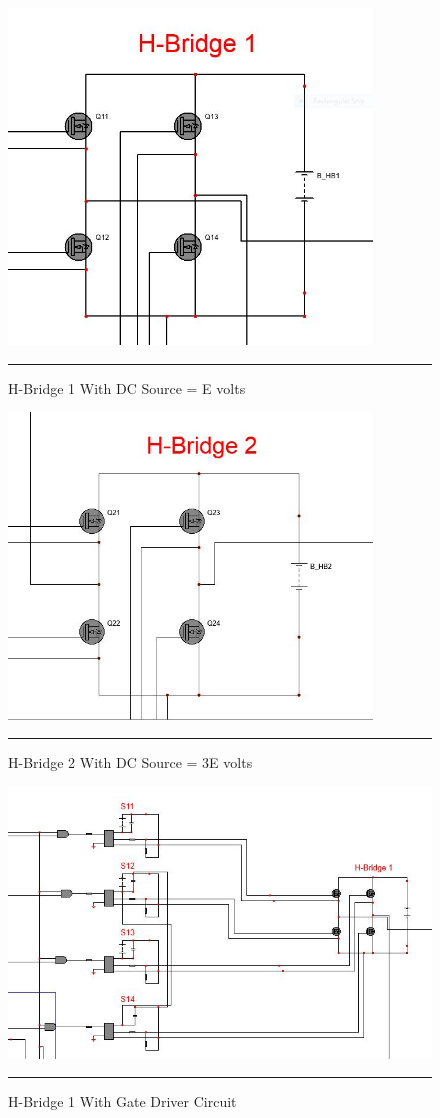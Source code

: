 \begin{figure}[htbp]
	\centering
	\includegraphics[width = 3.8in]{./Figures/HBridge1.JPG}
	\rule{35em}{1pt}
	\caption{H-Bridge 1 With DC Source = E volts}
	\label{fig:4}
\end{figure}
\begin{figure}[htbp]
	\centering
	\includegraphics[width = 3.8in]{./Figures/HBridge2.JPG}
	\rule{35em}{1pt}
	\caption{H-Bridge 2 With DC Source = 3E volts}
	\label{fig:4}
\end{figure}
\begin{figure}[htbp]
	\centering
	\includegraphics[width = 6in]{./Figures/C_1.JPG}
	\rule{35em}{1pt}
	\caption{H-Bridge 1 With Gate Driver Circuit}
	\label{fig:4}
\end{figure}
